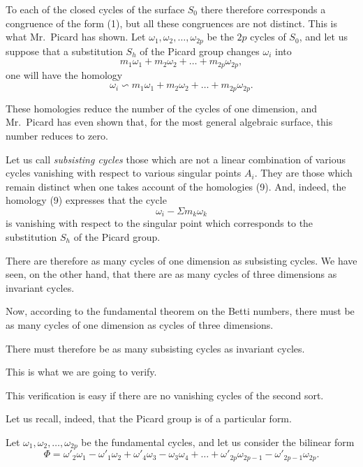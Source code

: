 \documentclass{article}
\begin{document}
To each of the closed cycles of the surface $S_{0}$ there therefore corresponds a congruence of the form (1), but all these congruences are not distinct. This is what Mr.~Picard has shown. Let $\omega_{1}, \omega_{2}, \ldots, \omega_{2p}$ be the $2p$ cycles of $S_{0}$, and let us suppose that a substitution $S_{h}$ of the Picard group changes $\omega_{i}$ into
\[ m_{1}\omega_{1} + m_{2}\omega_{2} + \ldots + m_{2p}\omega_{2p}, \]
one will have the homology
\[ \omega_{i} \backsim m_{1}\omega_{1} + m_{2}\omega_{2} + \ldots + m_{2p}\omega_{2p}. \tag{9} \]

These homologies reduce the number of the cycles of one dimension, and Mr.~Picard has even shown that, for the most general algebraic surface, this number reduces to zero.

Let us call \emph{subsisting cycles} those which are not a linear combination of various cycles vanishing with respect to various singular points $A_{i}$. They are those which remain distinct when one takes account of the homologies (9). And, indeed, the homology (9) expresses that the cycle
\[ \omega_{i} - \Sigma m_{k}\omega_{k} \]
is vanishing with respect to the singular point which corresponds to the substitution $S_{h}$ of the Picard group.

There are therefore as many cycles of one dimension as subsisting cycles. We have seen, on the other hand, that there are as many cycles of three dimensions as invariant cycles.


Now, according to the fundamental theorem on the Betti numbers, there must be as many cycles of one dimension as cycles of three dimensions.

There must therefore be as many subsisting cycles as invariant cycles.

This is what we are going to verify.

This verification is easy if there are no vanishing cycles of the second sort.

Let us recall, indeed, that the Picard group is of a particular form.

Let $\omega_{1}, \omega_{2}, \ldots, \omega_{2p}$ be the fundamental cycles, and let us consider the bilinear form
\[ \Phi = \omega'_{2}\omega_{1} - \omega'_{1}\omega_{2} + \omega'_{4}\omega_{3} - \omega_{3}\omega_{4} + \ldots + \omega'_{2p}\omega_{2p-1} - \omega'_{2p-1}\omega_{2p}. \]
\end{document}
